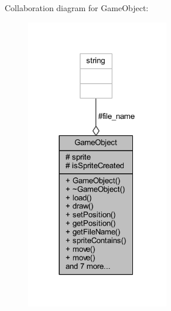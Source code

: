 Collaboration diagram for Game\+Object\+:
\nopagebreak
\begin{figure}[H]
\begin{center}
\leavevmode
\includegraphics[width=177pt]{class_game_object__coll__graph}
\end{center}
\end{figure}
